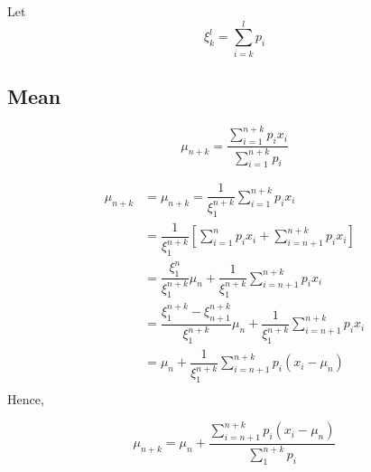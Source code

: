 \documentclass[a4paper, 11pt]{article}
\begin{document}
Let
\begin{displaymath}
  \xi_k^l = \sum_{i = k}^{l} p_i
\end{displaymath}

\subsection{Mean}

\begin{displaymath}
  \mu_{n + k} = \dfrac{\sum_{i = 1}^{n+k} p_i x_i}{\sum_{i = 1}^{n+k} p_i}
\end{displaymath}




\begin{align*}
  \mu_{n + k}
  &=
    \mu_{n + k} = \dfrac{1}{\xi_1^{n+k}} \sum_{i = 1}^{n+k} p_i x_i \\
  &=
    \dfrac{1}{\xi_{1}^{n+k}}
    \left[
    \sum_{i = 1}^{n} p_i x_i +
    \sum_{i = n+1}^{n+k} p_i x_i
    \right] \\
  &= \dfrac{\xi_{1}^{n}}{\xi_{1}^{n+k}}
    \mu_n +
    \dfrac{1}{\xi_{1}^{n+k}}
    \sum_{i = n+1}^{n+k} p_i x_i \\
  &= \dfrac{\xi_{1}^{n+k} - \xi_{n+1}^{n+k}}{\xi_{1}^{n+k}}
    \mu_n +
    \dfrac{1}{\xi_{1}^{n+k}}
    \sum_{i = n+1}^{n+k} p_i x_i \\
  &= \mu_n +
    \dfrac{1}{\xi_{1}^{n+k}}
    \sum_{i = n+1}^{n+k} p_i (x_i - \mu_n) \\
\end{align*}
Hence,
\begin{framed}
  \begin{displaymath}
    \mu_{n+k}= \mu_n +
    \dfrac{\sum_{i = n+1}^{n+k} p_i (x_i - \mu_n)}{\sum_{1}^{n+k}p_i}
  \end{displaymath}
\end{framed}
\end{document}
